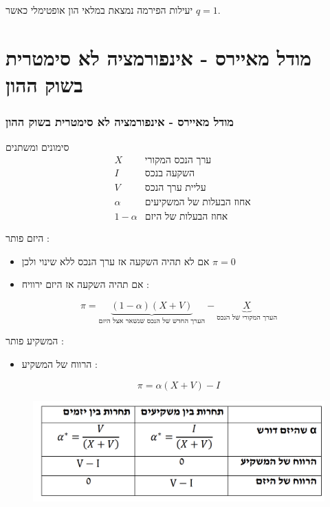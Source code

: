 \documentclass[usenames,dvipsnames, 10pt]{beamer}
\begin{document}
\begin{RTL}
\begin{frame}[allowframebreaks]
    \begin{alertblock}{יעילות}
        הפירמה נמצאת במלאי הון אופטימלי כאשר $q = 1$.
    \end{alertblock}
\end{frame}
\section{מודל מאיירס - אינפורמציה לא סימטרית בשוק ההון}
\begin{frame}[allowframebreaks]
    \frametitle{מודל מאיירס - אינפורמציה לא סימטרית בשוק ההון}
    \begin{block}{סימונים ומשתנים}
        \begin{align*}
             & X & \text{ערך הנכס המקורי} \\ & I & \text{השקעה בנכס} \\ & V & \text{עליית ערך הנכס} \\ & \alpha & \text{אחוז הבעלות של המשקיעים} \\ & 1-\alpha & \text{אחוז הבעלות של היזם}
         \end{align*}
    \end{block}
    \framebreak
    היזם פותר :
    \begin{itemize}
        \item אם לא תהיה השקעה אז ערך הנכס ללא שינוי ולכן $\pi = 0$
        \item אם תהיה השקעה אז היזם ירוויח : 
    \end{itemize}
    $$\pi = \underbrace{(1-\alpha)\left(X+V\right)}_{\text{הערך החדש של הנכס שנשאר אצל היזם}} - \underbrace{X}_{\text{הערך המקורי של הנכס}}$$
    
    המשקיע פותר : \\
    \begin{itemize}
        \item  הרווח של המשקיע :
    \end{itemize}
    $$\pi = \alpha(X+V) - I$$
    \begin{figure}
        \centering
        \includegraphics[width=\textwidth]{images/Screenshot 2023-12-03 at 19.35.55.png}
    \end{figure}


\end{frame}
\end{RTL}
\end{document}
